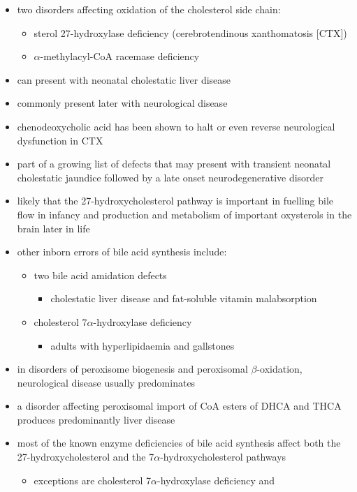 \documentclass{scrartcl}
\begin{document}
\begin{itemize}
\begin{enumerate}
\begin{enumerate}
\begin{itemize}
\item two disorders affecting oxidation of the cholesterol side chain:
\begin{itemize}
\item sterol 27-hydroxylase deficiency (cerebrotendinous xanthomatosis [CTX])
\item \(\alpha\)-methylacyl-CoA racemase deficiency
\end{itemize}
\item can present with neonatal cholestatic liver disease
\item commonly present later with neurological disease
\item chenodeoxycholic acid has been shown to halt or even reverse
neurological dysfunction in CTX
\item part of a growing list of defects that may present with transient
neonatal cholestatic jaundice followed by a late onset
neurodegenerative disorder
\item likely that the 27-hydroxycholesterol pathway is important in
fuelling bile flow in infancy and production and metabolism of
important oxysterols in the brain later in life
\item other inborn errors of bile acid synthesis include:
\begin{itemize}
\item two bile acid amidation defects
\begin{itemize}
\item cholestatic liver disease and fat-soluble vitamin malabsorption
\end{itemize}
\item cholesterol 7\(\alpha\)-hydroxylase deficiency
\begin{itemize}
\item adults with hyperlipidaemia and gallstones
\end{itemize}
\end{itemize}
\item in disorders of peroxisome biogenesis and peroxisomal
\(\beta\)-oxidation, neurological disease usually predominates
\item a disorder affecting peroxisomal import of CoA esters of DHCA and
THCA produces predominantly liver disease
\item most of the known enzyme deficiencies of bile acid synthesis affect
both the 27-hydroxycholesterol and the 7\(\alpha\)-hydroxycholesterol pathways
\begin{itemize}
\item exceptions are cholesterol 7\(\alpha\)-hydroxylase deficiency and

\end{itemize}
\end{itemize}
\end{enumerate}
\end{enumerate}
\end{itemize}
\end{document}
